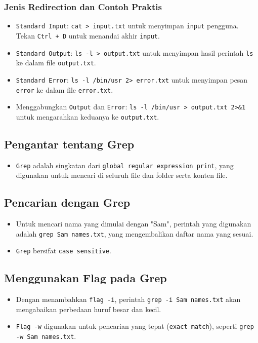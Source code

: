 \documentclass{article}
\begin{document}
\subsubsection{Jenis Redirection dan Contoh Praktis}
\begin{itemize}
    \item \texttt{Standard Input}: \texttt{cat > input.txt} untuk menyimpan \texttt{input} pengguna. Tekan \texttt{Ctrl + D} untuk menandai akhir \texttt{input}.
    \item \texttt{Standard Output}: \texttt{ls -l > output.txt} untuk menyimpan hasil perintah \texttt{ls} ke dalam file \texttt{output.txt}.
    \item \texttt{Standard Error}: \texttt{ls -l /bin/usr 2> error.txt} untuk menyimpan pesan \texttt{error} ke dalam file \texttt{error.txt}.
    \item Menggabungkan \texttt{Output} dan \texttt{Error}: \texttt{ls -l /bin/usr > output.txt 2\textgreater{}\&1} untuk mengarahkan keduanya ke \texttt{output.txt}.
\end{itemize}

\subsection{Pengantar tentang Grep}
\begin{itemize}
    \item \texttt{Grep} adalah singkatan dari \texttt{global regular expression print}, yang digunakan untuk mencari di seluruh file dan folder serta konten file.
\end{itemize}

\subsection{Pencarian dengan Grep}
\begin{itemize}
    \item Untuk mencari nama yang dimulai dengan "Sam", perintah yang digunakan adalah \texttt{grep Sam names.txt}, yang mengembalikan daftar nama yang sesuai.
    \item \texttt{Grep} bersifat \texttt{case sensitive}.
\end{itemize}

\subsection{Menggunakan Flag pada Grep}
\begin{itemize}
    \item Dengan menambahkan \texttt{flag -i}, perintah \texttt{grep -i Sam names.txt} akan mengabaikan perbedaan huruf besar dan kecil.
    \item \texttt{Flag -w} digunakan untuk pencarian yang tepat (\texttt{exact match}), seperti \texttt{grep -w Sam names.txt}.
\end{itemize}
\end{document}
